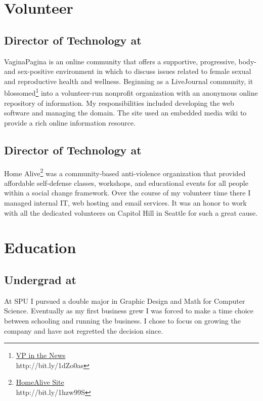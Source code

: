 \section{Volunteer }\label{sec:work-history}
\subsection{\textbf{Director of Technology} at  \shyears{[2001-2014]}}
VaginaPagina is an online community that offers a supportive, progressive, body- and sex-positive environment in which to discuss issues related to female sexual and reproductive health and wellness.  Beginning as a LiveJournal community, it blossomed\footnote{\href{http://www.dailydot.com/news/vagina-pagina-livejournal-tasha-walston/}{VP in the News}\\ http://bit.ly/1dZo0as} into a volunteer-run nonprofit organization with an anonymous online repository of information.  My responsibilities included developing the web software and managing the domain.  The site used an embedded media wiki to provide a rich online information resource.

\subsection{\textbf{Director of Technology} at  \shyears{[2000-2005]}}
Home Alive\footnote{\href{http://web.archive.org/web/20040721083500/http://www.homealive.org/}{HomeAlive Site}\\ http://bit.ly/1hzw99S} was a community-based anti-violence organization that provided affordable self-defense classes, workshops, and educational events for all people within a social change framework.  Over the course of my volunteer time there I managed internal IT, web hosting and email services.  It was an honor to work with all the dedicated volunteers on Capitol Hill in Seattle for such a great cause.

\bigskip
\bigskip

\section{Education }
\subsection{\textbf{Undergrad} at  \shyears[1995-1998]}
At SPU I pursued a double major in Graphic Design and Math for Computer Science.  Eventually as my first business grew I was forced to make a time choice between schooling and running the business.  I chose to focus on growing the company and have not regretted the decision since.

